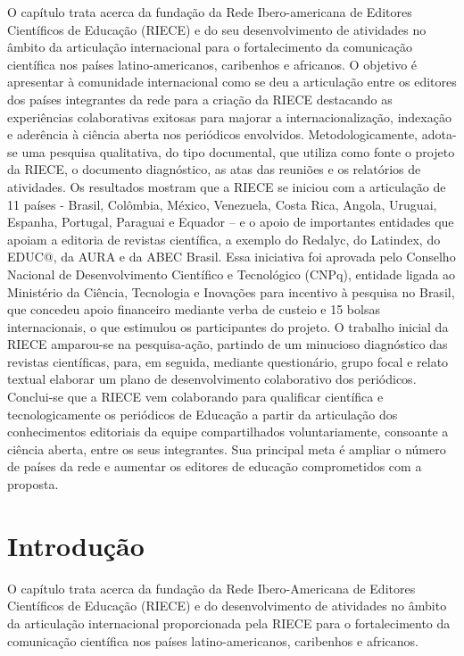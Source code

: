 \documentclass[
  a4paper,
]{book}
\begin{document}
O capítulo trata acerca da fundação da Rede Ibero-americana de Editores
Científicos de Educação (RIECE) e do seu desenvolvimento de atividades
no âmbito da articulação internacional para o fortalecimento da
comunicação científica nos países latino-americanos, caribenhos e
africanos. O objetivo é apresentar à comunidade internacional como se
deu a articulação entre os editores dos países integrantes da rede para
a criação da RIECE destacando as experiências colaborativas exitosas
para majorar a internacionalização, indexação e aderência à ciência
aberta nos periódicos envolvidos. Metodologicamente, adota-se uma
pesquisa qualitativa, do tipo documental, que utiliza como fonte o
projeto da RIECE, o documento diagnóstico, as atas das reuniões e os
relatórios de atividades. Os resultados mostram que a RIECE se iniciou
com a articulação de 11 países - Brasil, Colômbia, México, Venezuela,
Costa Rica, Angola, Uruguai, Espanha, Portugal, Paraguai e Equador -- e
o apoio de importantes entidades que apoiam a editoria de revistas
científica, a exemplo do Redalyc, do Latindex, do EDUC@, da AURA e da
ABEC Brasil. Essa iniciativa foi aprovada pelo Conselho Nacional de
Desenvolvimento Científico e Tecnológico (CNPq), entidade ligada ao
Ministério da Ciência, Tecnologia e Inovações para incentivo à pesquisa
no Brasil, que concedeu apoio financeiro mediante verba de custeio e 15
bolsas internacionais, o que estimulou os participantes do projeto. O
trabalho inicial da RIECE amparou-se na pesquisa-ação, partindo de um
minucioso diagnóstico das revistas científicas, para, em seguida,
mediante questionário, grupo focal e relato textual elaborar um plano de
desenvolvimento colaborativo dos periódicos. Conclui-se que a RIECE vem
colaborando para qualificar científica e tecnologicamente os periódicos
de Educação a partir da articulação dos conhecimentos editoriais da
equipe compartilhados voluntariamente, consoante a ciência aberta, entre
os seus integrantes. Sua principal meta é ampliar o número de países da
rede e aumentar os editores de educação comprometidos com a proposta.

\hfill\break

\section{Introdução}\label{introduuxe7uxe3o}

O capítulo trata acerca da fundação da Rede Ibero-Americana de Editores
Científicos de Educação (RIECE) e do desenvolvimento de atividades no
âmbito da articulação internacional proporcionada pela RIECE para o
fortalecimento da comunicação científica nos países latino-americanos,
caribenhos e africanos.
\end{document}
